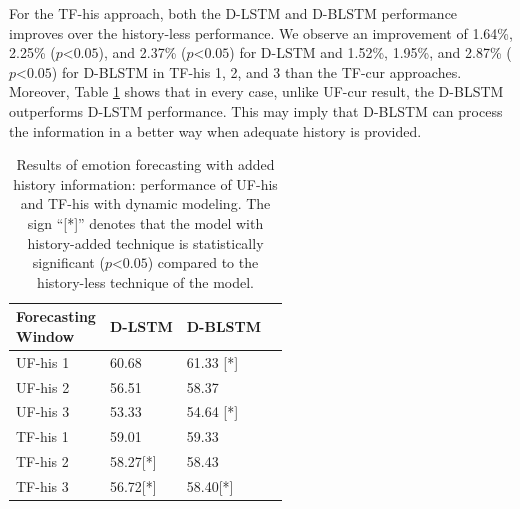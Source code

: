 For the TF-his approach, both the D-LSTM and D-BLSTM performance improves over the history-less performance. We observe an  improvement of 1.64\%, 2.25\% ($p$\textless$0.05$), and 2.37\% ($p$\textless$0.05$) for D-LSTM and 1.52\%, 1.95\%, and 2.87\% ($p$\textless$0.05$) for D-BLSTM in TF-his 1, 2, and 3 than the TF-cur approaches. Moreover, Table \ref{table:history} shows that in every case, unlike UF-cur result, the D-BLSTM outperforms D-LSTM performance. This may imply that D-BLSTM can process the information in a better way when adequate history is provided. 

\begin{table}[h]
\centering
\caption{Results of emotion forecasting with added history information: performance of UF-his and TF-his with dynamic modeling. The sign ``[*]'' denotes that the model with history-added technique is statistically significant ($p$\textless$0.05$) compared to the history-less technique of the model. }

\begin{tabular}{llll}
\hline
\makecell{\textbf{Forecasting}\\\textbf{Window}}  & \textbf{D-LSTM} & \textbf{D-BLSTM }\\
\hline
\hline
UF-his 1 & 60.68 & 61.33 [*] \\

UF-his 2 & 56.51 & 58.37 \\

UF-his 3 & 53.33 & 54.64 [*] \\

\hline

TF-his 1 & 59.01 & 59.33 \\

TF-his 2 & 58.27[*] & 58.43 \\

TF-his 3 & 56.72[*] & 58.40[*] \\

\hline
\end{tabular}
\label{table:history}
\end{table}



